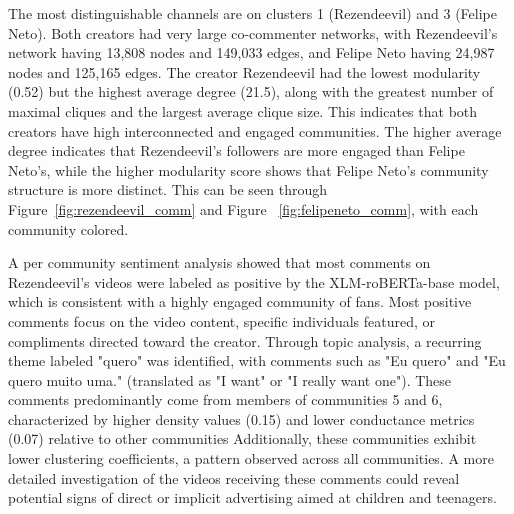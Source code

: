 \documentclass[12pt]{article}
\begin{document}
The most distinguishable channels are on clusters 1 (Rezendeevil) and 3 (Felipe Neto). 
Both creators had very large co-commenter networks, with Rezendeevil's network having 13,808 
nodes and 149,033 edges, and Felipe Neto having 24,987 nodes and 125,165 edges.
The creator Rezendeevil had the lowest modularity (0.52) but the highest average degree (21.5), 
along with the greatest number of maximal cliques and the largest average clique size.
This indicates that both creators have high interconnected and engaged communities. The higher average
degree indicates that Rezendeevil's followers are more engaged than Felipe Neto's, while the higher
modularity score shows that Felipe Neto's community structure is more distinct.
This can be seen through Figure~\ref{fig:rezendeevil_comm} and Figure ~\ref{fig:felipeneto_comm}, 
with each community colored.

A per community sentiment analysis showed that most comments on Rezendeevil's videos were labeled as 
positive by the XLM-roBERTa-base model, which is consistent with a highly engaged community of fans.
Most positive comments focus on the video content, specific individuals featured, or compliments directed toward the creator. 
Through topic analysis, a recurring theme labeled 
"quero" was identified, with comments such as "Eu quero" and "Eu quero muito uma." 
(translated as "I want" or "I really want one").
These comments predominantly come from members of communities 5 and 6, characterized by higher density 
values (0.15) and lower conductance metrics (0.07) relative to other communities
Additionally, these communities exhibit lower clustering coefficients, a pattern observed across all communities.
A more detailed investigation of the videos receiving these comments could reveal potential 
signs of direct or implicit advertising aimed at children and teenagers.
\end{document}
